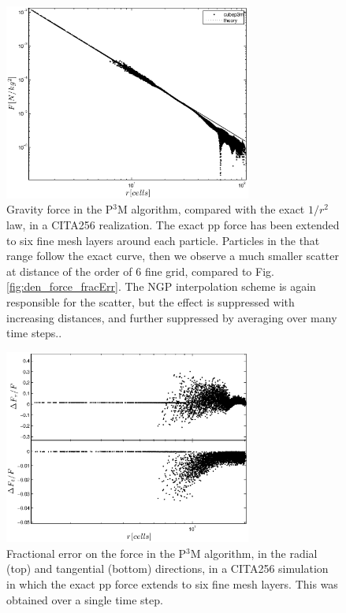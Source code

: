  \begin{figure}%
  \begin{center}
    \includegraphics[width=3.2in]{graphs/densityForce_ppext=6.eps}
  \caption{Gravity force in the P$^3$M algorithm, compared with the exact $1/r^{2}$ law,
  in a CITA256 realization. The exact pp force has been extended to six fine mesh layers around each particle.
  Particles in the that range follow the exact curve, then we observe a much smaller scatter at 
  distance of the order of 6 fine grid, compared to Fig. \ref{fig:den_force_fracErr}. 
  The NGP interpolation scheme is again responsible for the scatter, but the effect is suppressed with increasing distances, and further suppressed by averaging over many time steps.. 
    \label{fig:den_force_ppext6}}
\end{center}
\end{figure}


 
\begin{figure}%
  \begin{center}
    \includegraphics[width=3.2in]{graphs/densityForce_fracErr_ppext=6.eps}
  \caption{Fractional error on the force in the P$^3$M algorithm, in the radial (top) and tangential (bottom) directions,
  in a CITA256 simulation in which the exact pp force extends to six fine mesh layers. 
  This was obtained over a single time step.
    \label{fig:den_force_fracErr_ppext6}}
\end{center}
\end{figure}

